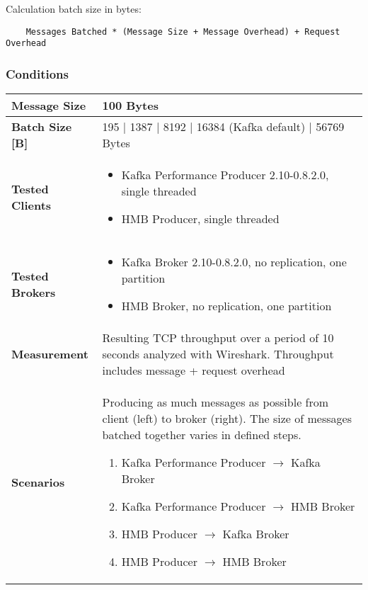 Calculation batch size in bytes:
\begin{verbatim}
    Messages Batched * (Message Size + Message Overhead) + Request Overhead 
\end{verbatim}

\subsubsection{Conditions}
\begin{table}[H]
\begin{tabular}{|l| p{12cm}|} \hline
{\bf Message Size}   & 100 Bytes \\ \hline
{\bf Batch Size [B]} & 195 | 1387 | 8192 | 16384 (Kafka default) | 56769 Bytes \\ \hline
{\bf Tested Clients} &
    \begin{itemize}
        \item Kafka Performance Producer 2.10-0.8.2.0, single threaded
        \item HMB Producer, single threaded
    \end{itemize}\\ \hline
{\bf Tested Brokers} &
    \begin{itemize}
        \item Kafka Broker 2.10-0.8.2.0, no replication, one partition
        \item HMB Broker, no replication, one partition
    \end{itemize}\\ \hline
{\bf Measurement} & Resulting TCP throughput over a period of 10 seconds analyzed with
    Wireshark. Throughput includes message + request overhead\\ \hline
{\bf Scenarios} & Producing as much messages as possible from client (left) to broker (right).
    The size of messages batched together varies in defined steps.
    \begin{enumerate}
        \item Kafka Performance Producer $\rightarrow$ Kafka Broker
        \item Kafka Performance Producer $\rightarrow$ HMB Broker
        \item HMB Producer $\rightarrow$ Kafka Broker
        \item HMB Producer $\rightarrow$ HMB Broker
    \end{enumerate} \\ \hline
\end{tabular}
\end{table}
\newpage

